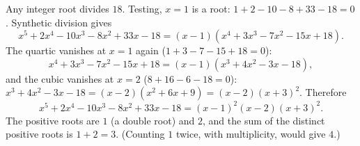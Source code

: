 Any integer root divides $18$. Testing, $x=1$ is a root: $1+2-10-8+33-18=0$. Synthetic division gives
\[
x^5+2x^4-10x^3-8x^2+33x-18=(x-1)\left(x^4+3x^3-7x^2-15x+18\right).
\]
The quartic vanishes at $x=1$ again ($1+3-7-15+18=0$):
\[
x^4+3x^3-7x^2-15x+18=(x-1)\left(x^3+4x^2-3x-18\right),
\]
and the cubic vanishes at $x=2$ ($8+16-6-18=0$): $x^3+4x^2-3x-18=(x-2)(x^2+6x+9)=(x-2)(x+3)^2$. Therefore
\[
x^5+2x^4-10x^3-8x^2+33x-18=(x-1)^2(x-2)(x+3)^2 .
\]
The positive roots are $1$ (a double root) and $2$, and the sum of the distinct positive roots is $1+2=\boxed{3}$. (Counting $1$ twice, with multiplicity, would give $4$.)
